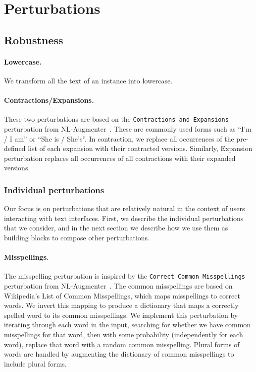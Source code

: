 \section{Perturbations}
\label{app:perturbations}
\subsection{Robustness}
\label{app:perturbations-robustness}

\paragraph{Lowercase.} We transform all the text of an instance into lowercase.

\paragraph{Contractions/Expansions.}
These two perturbations are based on the \texttt{Contractions and Expansions} perturbation from NL-Augmenter~\citep{dhole2021nl}. These are commonly used forms such as ``I'm / I am'' or ``She is / She's''. In contraction, we replace all occurrences of the pre-defined list of each expansion with their contracted versions. Similarly, Expansion perturbation replaces all occurrences of all contractions with their expanded versions.

\subsubsection{Individual perturbations}
Our focus is on perturbations that are relatively natural in the context of users interacting with text interfaces.
First, we describe the individual perturbations that we consider, and in the next section we describe how we use them as building blocks to compose other perturbations.

\paragraph{Misspellings.}
The misspelling perturbation is inspired by the \texttt{Correct Common Misspellings} perturbation from NL-Augmenter~\citep{dhole2021nl}. The common misspellings are based on Wikipedia's List of Common Misspellings, which maps misspellings to correct words. We invert this mapping to produce a dictionary that maps a correctly spelled word to its common misspellings. We implement this perturbation by iterating through each word in the input, searching for whether we have common misspellings for that word, then with some probability (independently for each word), replace that word with a random common misspelling. Plural forms of words are handled by augmenting the dictionary of common misspellings to include plural forms.

